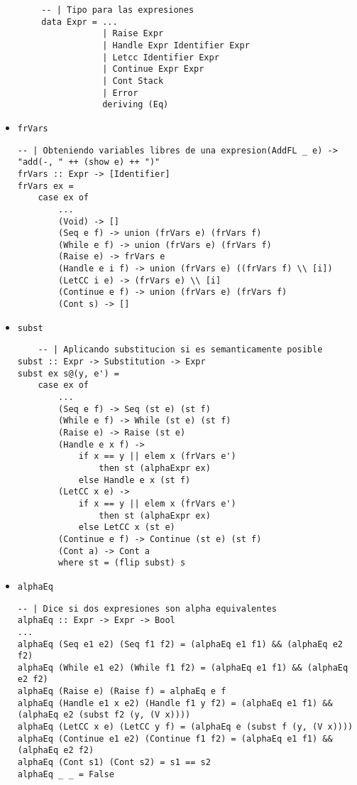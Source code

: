 \documentclass{article}
\newcommand{\tx}[1]{\texttt{#1}}
\begin{document}
    \begin{verbatim}
        -- | Tipo para las expresiones
        data Expr = ...
                    | Raise Expr
                    | Handle Expr Identifier Expr
                    | Letcc Identifier Expr
                    | Continue Expr Expr
                    | Cont Stack
                    | Error
                    deriving (Eq)
    \end{verbatim}
    \begin{itemize}
        \item \tx{frVars}
        \begin{verbatim}
-- | Obteniendo variables libres de una expresion(AddFL _ e) -> "add(-, " ++ (show e) ++ ")"
frVars :: Expr -> [Identifier]
frVars ex =
	case ex of
		...
		(Void) -> []
		(Seq e f) -> union (frVars e) (frVars f)
		(While e f) -> union (frVars e) (frVars f)
		(Raise e) -> frVars e
		(Handle e i f) -> union (frVars e) ((frVars f) \\ [i])
		(LetCC i e) -> (frVars e) \\ [i]
		(Continue e f) -> union (frVars e) (frVars f)
		(Cont s) -> []
        \end{verbatim}
        
        
        \item \tx{subst}
        \begin{verbatim}
    -- | Aplicando substitucion si es semanticamente posible
subst :: Expr -> Substitution -> Expr
subst ex s@(y, e') =
	case ex of
		...
		(Seq e f) -> Seq (st e) (st f)
		(While e f) -> While (st e) (st f)
		(Raise e) -> Raise (st e)
		(Handle e x f) ->
			if x == y || elem x (frVars e')
				then st (alphaExpr ex)
			else Handle e x (st f)
		(LetCC x e) ->
			if x == y || elem x (frVars e')
				then st (alphaExpr ex)
			else LetCC x (st e)
		(Continue e f) -> Continue (st e) (st f)
		(Cont a) -> Cont a
		where st = (flip subst) s
        \end{verbatim}
        
        \item \tx{alphaEq}
        \begin{verbatim}
-- | Dice si dos expresiones son alpha equivalentes
alphaEq :: Expr -> Expr -> Bool
...
alphaEq (Seq e1 e2) (Seq f1 f2) = (alphaEq e1 f1) && (alphaEq e2 f2)
alphaEq (While e1 e2) (While f1 f2) = (alphaEq e1 f1) && (alphaEq e2 f2)
alphaEq (Raise e) (Raise f) = alphaEq e f
alphaEq (Handle e1 x e2) (Handle f1 y f2) = (alphaEq e1 f1) && (alphaEq e2 (subst f2 (y, (V x))))
alphaEq (LetCC x e) (LetCC y f) = (alphaEq e (subst f (y, (V x))))
alphaEq (Continue e1 e2) (Continue f1 f2) = (alphaEq e1 f1) && (alphaEq e2 f2)
alphaEq (Cont s1) (Cont s2) = s1 == s2
alphaEq _ _ = False
        \end{verbatim}
    \end{itemize}
\end{document}
